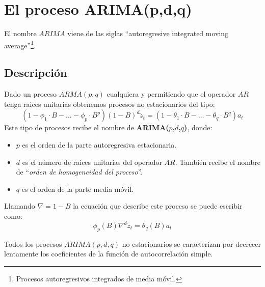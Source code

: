 %
%

\section{El proceso ARIMA(p,d,q)}

El nombre $ARIMA$ viene de las siglas ``autoregresive integrated moving
average''\footnote{Procesos autoregresivos integrados de media m\'ovil.}.

\subsection{Descripci\'on}

Dado un proceso $ARMA(p,q)$ cualquiera y permitiendo que el operador $AR$
tenga raices unitarias obtenemos procesos no estacionarios del tipo:
\begin{displaymath}
(1-\phi_1\cdot B-\dots-\phi_p\cdot B^p)(1-B)^d\widetilde{z}_t =(1-\theta_1\cdot 
B-\dots-\theta_q\cdot B^q)a_t
\end{displaymath}
Este tipo de procesos recibe el nombre de \textbf{ARIMA($p$,$d$,$q$)}, donde:
\begin{itemize}
\item $p$ es el orden de la parte autoregresiva estacionaria.
\item $d$ es el n\'umero de raices unitarias del operador $AR$. Tambi\'en recibe
el nombre de ``\emph{orden de homogeneidad del proceso}''.
\item $q$ es el orden de la parte media m\'ovil.
\end{itemize}

Llamando $\nabla=1-B$ la ecuaci\'on que describe este proceso se puede
escribir como:
\begin{displaymath}
\phi_p(B)\nabla^d\widetilde{z}_t=\theta_q(B)a_t
\end{displaymath}

Todos los procesos $ARIMA(p,d,q)$ no estacionarios se caracterizan por decrecer
lentamente los coeficientes de la funci\'on de autocorrelaci\'on simple.
%
\newpage
%

%
%



